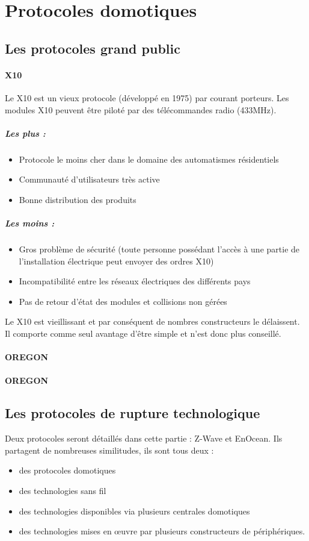 \documentclass[a4paper,10pt]{article}
\begin{document}
\section{Protocoles domotiques}

\subsection{Les protocoles grand public}
\paragraph{X10}
Le X10 est un vieux protocole (développé en 1975) par courant porteurs.  Les modules X10 peuvent être piloté par des télécommandes radio (433MHz). 

\subparagraph{Les plus :}
\begin{itemize}
\item Protocole le moins cher dans le domaine des automatismes résidentiels
\item Communauté d'utilisateurs très active
\item Bonne distribution des produits
\end{itemize}
\subparagraph{Les moins :}
\begin{itemize}
\item Gros problème de sécurité (toute personne possédant l'accès à une partie de l'installation électrique peut envoyer des ordres X10)
\item Incompatibilité entre les réseaux électriques des différents pays
\item Pas de retour d'état des modules et collisions non gérées
\end{itemize}
Le X10 est vieillissant et par conséquent de nombres constructeurs le délaissent. Il comporte comme seul avantage d'être simple et n'est donc plus conseillé.
\paragraph{OREGON}
\paragraph{OREGON}


\subsection{Les protocoles de rupture technologique}
Deux protocoles seront détaillés dans cette partie : Z-Wave et EnOcean. Ils partagent de nombreuses similitudes, ils sont tous deux :
\begin{itemize}
\item des protocoles domotiques
\item des technologies sans fil
\item des technologies disponibles via plusieurs centrales domotiques
\item des technologies mises en œuvre par plusieurs constructeurs de périphériques.

\end{itemize}
\end{document}
